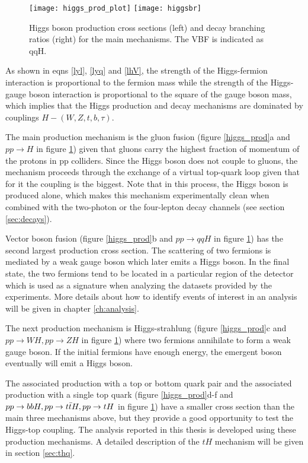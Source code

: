 \begin{figure}[!h]
\centering
\texttt{[image: higgs\_prod\_plot]}
\texttt{[image: higgsbr]}
\caption[Higgs boson production cross section and decay branching ratios]{Higgs boson production cross sections (left) and decay branching ratios (right) for the main mechanisms. The VBF is indicated as qqH\cite{hcswg}.}
\label{hcs_br}
\end{figure}

\noindent As shown in eqns \ref{lyl}, \ref{lyq} and \ref{lhV}, the strength of the Higgs-fermion interaction is proportional to the fermion mass while the strength of the Higgs-gauge boson interaction is proportional to the square of the gauge boson mass, which implies that the Higgs production and decay mechanisms are dominated by couplings $H-(W,Z,t,b,\tau)$. 

\noindent The main production mechanism is the gluon fusion (figure \ref{higgs_prod}a and $pp\to H$ in figure \ref{hcs_br}) given that gluons carry the highest fraction of momentum of the protons in pp colliders. Since the Higgs boson does not couple to gluons, the mechanism proceeds through the exchange of a virtual top-quark loop given that for it the coupling is the biggest. Note that in this process, the Higgs boson is produced alone, which makes this mechanism experimentally clean when combined with the two-photon or the four-lepton decay channels (see section \ref{sec:decays}).

\noindent Vector boson fusion (figure \ref{higgs_prod}b and $pp\to qqH$ in figure \ref{hcs_br}) has the second largest production cross section. The scattering of two fermions is mediated by a weak gauge boson which later emits a Higgs boson. In the final state, the two fermions tend to be located in a particular region of the detector which is used as a signature when analyzing the datasets provided by the experiments. More details about how to identify events of interest in an analysis will be given in chapter \ref{ch:analysis}. 

\noindent The next production mechanism is Higgs-strahlung (figure \ref{higgs_prod}c and $pp\to WH, pp\to ZH$ in figure \ref{hcs_br}) where two fermions annihilate to form a weak gauge boson. If the initial fermions have enough energy, the emergent boson eventually will emit a Higgs boson.

\noindent The associated production with a top or bottom quark pair and the associated production with a single top quark (figure \ref{higgs_prod}d-f and $pp\to bbH, pp\to t\bar{t}H, pp\to tH$ in figure \ref{hcs_br}) have a smaller cross section than the main three mechanisms above, but they provide a good opportunity to test the Higgs-top coupling. The analysis reported in this thesis is developed using these production mechanisms. A detailed description of the $tH$ mechanism will be given in section \ref{sec:thq}.  

